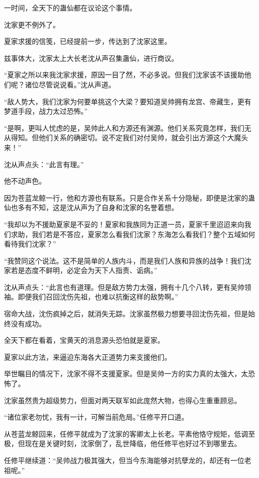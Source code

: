 \begin{this_body}
一时间，全天下的蛊仙都在议论这个事情。

沈家更不例外了。

夏家求援的信笺，已经提前一步，传达到了沈家这里。

兹事体大，沈家太上大长老沈从声召集蛊仙，进行商议。

“夏家之所以来我沈家求援，原因一目了然，不必多说。但我们沈家该不该援助他们呢？诸位尽管说说看。”沈从声道。

“敌人势大，我们沈家为何要单挑这个大梁？要知道吴帅拥有龙宫、帝藏生，更有梦道手段，战力太过恐怖。”

“是啊，更叫人忧虑的是，吴帅此人和方源还有渊源。他们关系究竟怎样，我们无从得知。但他们关系的确密切。说不定我们对付吴帅，就会引出方源这个大魔头来！”

沈从声点头：“此言有理。”

他不动声色。

因为苍蓝龙鲸一行，他和方源也有联系。只是合作关系十分隐秘，即便是沈家的蛊仙也多有不知，这是沈从声为了自身和沈家的名誉着想。

“我却以为不援助夏家是不妥的！夏家和我族同为正道一员，夏家千里迢迢来向我们求助，我们若是不答应，夏家怎么看我们沈家？东海怎么看我们？整个五域如何看待我们沈家？”

“我赞同这个说法。这不是简单的人族内斗，而是我们人族和异族的战争！我们沈家若是态度不鲜明，必定会为天下人指责、诟病。”

沈从声点头：“此言也有道理。但是敌方势力太强，拥有十几个八转，更有吴帅领袖。即便我们召回沈伤先祖，也难以抗衡这样的敌势啊。”

宿命大战，沈伤疯掉之后，就消失无踪。沈家虽然极力想要寻回沈伤先祖，但是始终没有成功。

全天下都在看着，宝黄天的消息源头恐怕就是夏家。

夏家以此方法，来逼迫东海各大正道势力来支援他们。

举世瞩目的情况下，沈家不得不支援夏家。但是吴帅一方的实力真的太强大，太恐怖了。

沈家虽然贵为超级势力，但面对两天联军如此庞然大物，也得心生重重顾忌。

“诸位家老勿忧，我有一计，可解当前危局。”任修平开口道。

从苍蓝龙鲸回来，任修平就成为了沈家的客卿太上长老。平素他恪守规矩，低调至极，但现在是关键时刻，沈家倒了，乱世降临，他任修平也好过不到哪里去。

任修平继续道：“吴帅战力极其强大，但当今东海能够对抗孽龙的，却还有一位老祖呢。”


\end{this_body}
